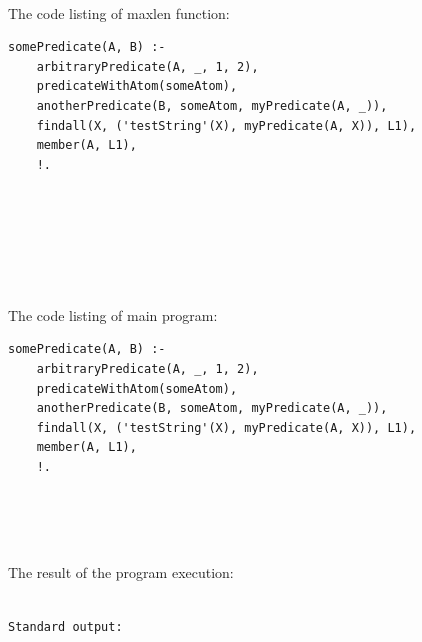\documentclass{article}
\begin{document}
\paragraph{}\
\paragraph{}\
\paragraph{}\



\noindent The code listing of maxlen function:
\ttfamily
	
\begin{verbatim} 
somePredicate(A, B) :-
    arbitraryPredicate(A, _, 1, 2),
    predicateWithAtom(someAtom),
    anotherPredicate(B, someAtom, myPredicate(A, _)),
    findall(X, ('testString'(X), myPredicate(A, X)), L1),
    member(A, L1),
    !.
\end{verbatim}
	

\paragraph{}\
\paragraph{}\
\paragraph{}\

		\rmfamily
		\noindent The code listing of main program:
		\begin{verbatim}
somePredicate(A, B) :-
    arbitraryPredicate(A, _, 1, 2),
    predicateWithAtom(someAtom),
    anotherPredicate(B, someAtom, myPredicate(A, _)),
    findall(X, ('testString'(X), myPredicate(A, X)), L1),
    member(A, L1),
    !.
		\end{verbatim}


\paragraph{}\
	
	\rmfamily\
	
		\noindent The result of the program execution:
		
	\ttfamily
	\begin{lstlisting}[language=bash]

Standard output:

	\end{lstlisting}
	
\end{document}
